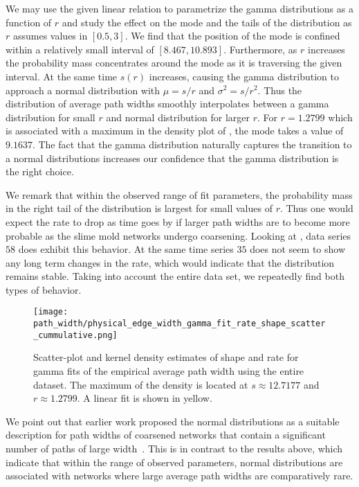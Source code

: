 		We may use the given linear relation to parametrize the gamma distributions as a function of $r$ and study the effect on the mode and the tails of the distribution as $r$ assumes values in $[0.5,3]$. We find that the position of the mode is confined within a relatively small interval of $[8.467,10.893]$. Furthermore, as $r$ increases the probability mass concentrates around the mode as it is traversing the given interval. At the same time $s(r)$ increases, causing the gamma distribution to approach a normal distribution with $\mu = s/r$ and $\sigma^2= s/r^2$. Thus the distribution of average path widths smoothly interpolates between a gamma distribution for small $r$ and normal distribution for larger $r$. For $r = 1.2799$ which is associated with a maximum in the density plot of , the mode takes a value of $9.1637$. The fact that the gamma distribution naturally captures the transition to a normal distributions increases our confidence that the gamma distribution is the right choice.

		We remark that within the observed range of fit parameters, the probability mass in the right tail of the distribution is largest for small values of $r$. Thus one would expect the rate to drop as time goes by if larger path widths are to become more probable as the slime mold networks undergo coarsening. Looking at , data series $58$ does exhibit this behavior. At the same time series $35$ does not seem to show any long term changes in the rate, which would indicate that the distribution remains stable. Taking into account the entire data set, we repeatedly find both types of behavior.

		\begin{figure}[!htbp]
			\centering
				\texttt{[image: path\_width/physical\_edge\_width\_gamma\_fit\_rate\_shape\_scatter\_cummulative.png]}
			\caption[Path width distribution fit parameter densities.]{Scatter-plot and kernel density estimates of shape and rate for gamma fits of the empirical average path width using the entire dataset. The maximum of the density is located at $s \approx 12.7177$ and $r \approx 1.2799$. A linear fit is shown in yellow.}
			\label{fig:path_widths_gamma_fit_kde}
		\end{figure}

		We point out that earlier work proposed the normal distributions as a suitable description for path widths of coarsened networks that contain a significant number of paths of large width~\cite{baumgarten2010plasmodial}. This is in contrast to the results above, which indicate that within the range of observed parameters, normal distributions are associated with networks where large average path widths are comparatively rare.

